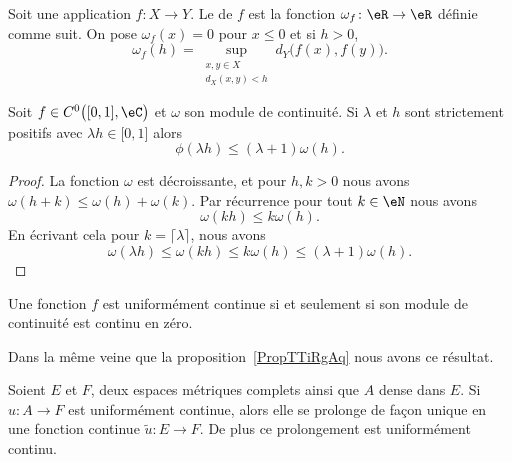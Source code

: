 \begin{definition}
    Soit une application \( f\colon X\to Y\). Le  de \( f\) est la fonction \( \omega_f\colon \eR\to \eR\) définie comme suit. On pose \( \omega_f(x)=0\) pour \( x\leq 0\) et si \( h>0\),
    \begin{equation}
        \omega_f(h)=\sup_{\substack{x,y\in X\\d_X(x,y)<h}} d_Y\big( f(x),f(y) \big).
    \end{equation}
\end{definition}

\begin{lemma}   \label{LemLUbgYeo}
    Soit \( f\in C^0\big( \mathopen[ 0 , 1 \mathclose],\eC \big)\) et \( \omega\) son module de continuité. Si \( \lambda\) et \( h\) sont strictement positifs avec \( \lambda h\in\mathopen[ 0 , 1 \mathclose]\) alors
    \begin{equation}
        \phi(\lambda h)\leq (\lambda+1)\omega(h).
    \end{equation}
\end{lemma}

\begin{proof}
    La fonction \( \omega\) est décroissante, et pour \( h,k>0\) nous avons \( \omega(h+k)\leq\omega(h)+\omega(k)\). Par récurrence pour tout \( k\in \eN\) nous avons
    \begin{equation}
        \omega(kh)\leq k\omega(h).
    \end{equation}
    En écrivant cela pour \( k=\lceil \lambda\rceil\), nous avons
    \begin{equation}
        \omega(\lambda h)\leq \omega(kh)\leq k\omega(h)\leq (\lambda+1)\omega(h).
    \end{equation}
\end{proof}

\begin{lemma}   \label{LemeERapq}
    Une fonction \( f\) est uniformément continue si et seulement si son module de continuité est continu en zéro.
\end{lemma}

Dans la même veine que la proposition~\ref{PropTTiRgAq} nous avons ce résultat.
\begin{theorem}      \label{ThoPVFQMi}
    Soient \( E\) et \( F\), deux espaces métriques complets ainsi que \( A\) dense dans \( E\). Si \( u\colon A\to F\) est uniformément continue, alors elle se prolonge de façon unique en une fonction continue \( \tilde u\colon E\to F\). De plus ce prolongement est uniformément continu.
\end{theorem}

